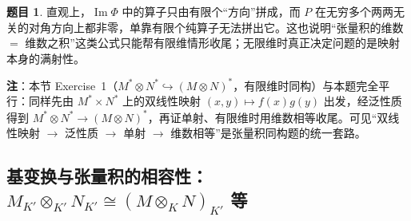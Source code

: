 \documentclass[a4paper]{ctexart}
\theoremstyle{definition}
\newtheorem{example}{题目}[section]
\theoremstyle{analysis}
\theoremstyle{plain}
\begin{document}
\begin{example}
直观上，\(\operatorname{Im}\Phi\) 中的算子只由有限个``方向''拼成，而 \(P\) 在无穷多个两两无关的对角方向上都非零，单靠有限个纯算子无法拼出它。这也说明``张量积的维数 \(=\) 维数之积''这类公式只能帮有限维情形收尾；无限维时真正决定问题的是映射本身的满射性。

\textbf{注}：本节 Exercise~1（\(M^*\otimes N^*\hookrightarrow (M\otimes N)^*\)，有限维时同构）与本题完全平行：同样先由 \(M^*\times N^*\) 上的双线性映射 \((x,y)\mapsto f(x)g(y)\) 出发，经泛性质得到 \(M^*\otimes N^*\to(M\otimes N)^*\)，再证单射、有限维时用维数相等收尾。可见``双线性映射 \(\to\) 泛性质 \(\to\) 单射 \(\to\) 维数相等''是张量积同构题的统一套路。
\end{example}

\subsection{\texorpdfstring{基变换与张量积的相容性：\(M_{K'}\otimes_{K'}N_{K'}\cong(M\otimes_KN)_{K'}\) 等}{基变换与张量积的结合律、交换律与单位律}}\label{subsec:problem-base-change-tensor}
\end{document}
